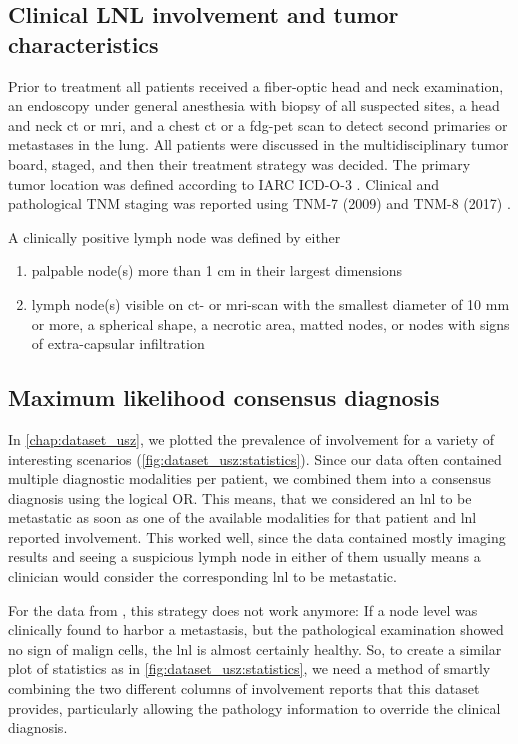\documentclass[\relativeRoot/main.tex]{subfiles}
\begin{document}
\subsection{Clinical LNL involvement and tumor characteristics}
\label{subsec:dataset_clb:methods:involvement}

Prior to treatment all patients received a fiber-optic head and neck examination, an endoscopy under general anesthesia with biopsy of all suspected sites, a head and neck \gls{ct} or \gls{mri}, and a chest \gls{ct} or a \gls{fdg-pet} scan to detect second primaries or metastases in the lung. All patients were discussed in the multidisciplinary tumor board, staged, and then their treatment strategy was decided. The primary tumor location was defined according to IARC ICD-O-3 \cite{fritz_international_2000}. Clinical and pathological TNM staging was reported using TNM-7 (2009) and TNM-8 (2017) \cite{brierley_tnm_2017}.

A clinically positive lymph node was defined by either

\begin{enumerate}[label={\alph*)}]
    \item palpable node(s) more than 1 cm in their largest dimensions
    \item lymph node(s) visible on \gls{ct}- or \gls{mri}-scan with the smallest diameter of 10 mm or more, a spherical shape, a necrotic area, matted nodes, or nodes with signs of extra-capsular infiltration
\end{enumerate}

\subsection{Maximum likelihood consensus diagnosis}
\label{subsec:dataset_clb:methods:max_llh}

In \cref{chap:dataset_usz}, we plotted the prevalence of involvement for a variety of interesting scenarios (\cref{fig:dataset_usz:statistics}). Since our data often contained multiple diagnostic modalities per patient, we combined them into a consensus diagnosis using the logical OR. This means, that we considered an \gls{lnl} to be metastatic as soon as one of the available modalities for that patient and \gls{lnl} reported involvement. This worked well, since the data contained mostly imaging results and seeing a suspicious lymph node in either of them usually means a clinician would consider the corresponding \gls{lnl} to be metastatic.

For the data from , this strategy does not work anymore: If a node level was clinically found to harbor a metastasis, but the pathological examination showed no sign of malign cells, the \gls{lnl} is almost certainly healthy. So, to create a similar plot of statistics as in \cref{fig:dataset_usz:statistics}, we need a method of smartly combining the two different columns of involvement reports that this dataset provides, particularly allowing the pathology information to override the clinical diagnosis.
\end{document}
